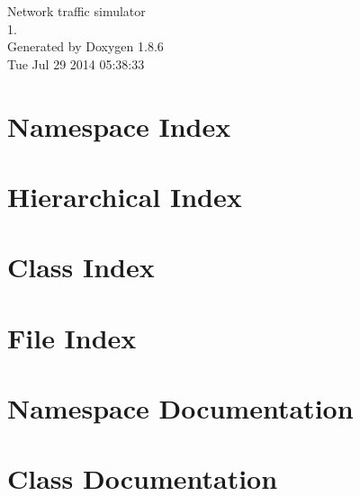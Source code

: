 \documentclass[twoside]{book}
\newcommand{\clearemptydoublepage}{%
  \newpage{\pagestyle{empty}\cleardoublepage}%
}
\begin{document}
\hypersetup{pageanchor=false}
\begin{titlepage}
\vspace*{7cm}
\begin{center}%
{\Large Network traffic simulator \\[1ex]\large 1. }\\
\vspace*{1cm}
{\large Generated by Doxygen 1.8.6}\\
\vspace*{0.5cm}
{\small Tue Jul 29 2014 05:38:33}\\
\end{center}
\end{titlepage}
\clearemptydoublepage
\tableofcontents
\clearemptydoublepage
{}
\hypersetup{pageanchor=true}

\chapter{Namespace Index}

\chapter{Hierarchical Index}

\chapter{Class Index}

\chapter{File Index}

\chapter{Namespace Documentation}



\chapter{Class Documentation}
























\end{document}
